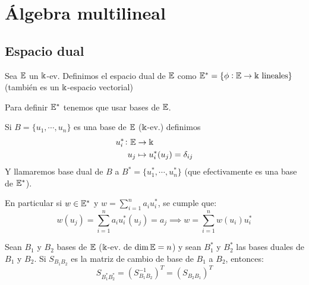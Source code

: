 \chapter{Álgebra multilineal}




\section{Espacio dual}

\begin{defi}
    Sea $\mathbb{E}$ un $\Bbbk$-ev. Definimos el espacio dual de $\mathbb{E}$ como
    $\mathbb{E}^* = \{ \phi : \mathbb{E} \to \Bbbk \text{ lineales} \}$ (también es un
    $\Bbbk$-espacio vectorial)
\end{defi}
\begin{obs}
    Para definir $\mathbb{E}^*$ tenemos que usar bases de $\mathbb{E}$.
\end{obs}
\begin{defi}
    Si $B = \{ u_1,\cdots, u_n \}$ es una base de $\mathbb{E}$ ($\Bbbk$-ev.)
    definimos
    \[
        \begin{aligned}
            u_i^* \colon \mathbb{E} &\to \Bbbk\\
            u_j &\mapsto u_i^*(u_j) = \delta_{ij}
        \end{aligned}
    \]
    Y llamaremos base dual de $B$ a
    $B^* = \{ u_1^*, \cdots, u_n^* \}$ (que efectivamente es una
    base de $\mathbb{E}^*$).
\end{defi}
\begin{obs}
    En particular si $w \in \mathbb{E}^*$ y
    $\displaystyle w = \sum_{i=1}^{n} a_i u_i^*$, se cumple que:
    \[
        w(u_j) = \sum_{i=1}^{n} a_i u_i^*(u_j) = a_j
        \implies
        w = \sum_{i=1}^{n}w(u_i)u_i^*
    \]
\end{obs}

\begin{prop}
    Sean $B_1$ y $B_2$ bases de $\mathbb{E}$ ($\Bbbk$-ev. de $\dim  \mathbb{E} = n$) y
    sean $B_1^*$ y $B_2^*$ las bases duales de $B_1$ y $B_2$.
    Si $S_{B_1B_2}$ es la matriz de cambio de base de $B_1$ a
    $B_2$, entonces:
    \[
        S_{B_1^*B_2^*} = (S_{B_1B_2}^{-1})^T = (S_{B_2B_1})^T
    \]
\end{prop}

